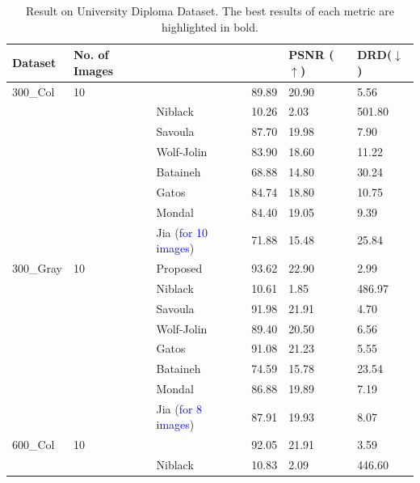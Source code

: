 \documentclass[runningheads]{llncs}
\begin{document}
\begin{table}[bht!]
	\centering
	\begin{threeparttable}
		\centering\small
		\caption{Result on University Diploma Dataset\label{tab:allResultStats}. The best results of each metric are highlighted in bold.}
		\centering
		\begin{tabular}{ P{1.4cm} P{1.2cm} P{1.8cm} P{1.8cm} P{1.2cm} P{1.4cm} }
			\toprule
			\centering
			{Dataset} &{No. of Images} &  &  & {PSNR} ($\uparrow$)& {DRD}($\downarrow$) \\ \midrule \midrule
			\centering
			{300\_Col}  &  10&  & 89.89 & 20.90 & \cellcolor{gray}5.56 
			\\ & & Niblack & 10.26 & 2.03 & 501.80 
			\\ & & Savoula & 87.70 & 19.98 & 7.90 
			\\ & & Wolf-Jolin & 83.90 & 18.60 & 11.22 \\ 
			& & Bataineh \cite{Bataineh2011} & 68.88 & 14.80 & 30.24 \\
			& & Gatos \cite{Gatos2006} & 84.74 & 18.80 & 10.75 \\
			& & Mondal \cite{Mondal2019} & 84.40 & 19.05 & 9.39 \\
			& & Jia \cite{Jia2018} (\textcolor{blue}{for 10 images}) & 71.88 & 15.48 & 25.84 \\
			\midrule
			\centering
			{300\_Gray}  & 10 & {Proposed} &  93.62 &  22.90 & \cellcolor{gray} 2.99 
			\\ & & Niblack & 10.61 & 1.85 & 486.97 
			\\ & & Savoula & 91.98 & 21.91 & 4.70 
			\\ & & Wolf-Jolin & 89.40 & 20.50 & 6.56 \\ 
			& & Gatos \cite{Gatos2006} & 91.08 & 21.23 & 5.55 \\
			& & Bataineh \cite{Bataineh2011} & 74.59 & 15.78 & 23.54 \\
			& & Mondal \cite{Mondal2019} & 86.88 & 19.89 & 7.19 \\
			& & Jia \cite{Jia2018} (\textcolor{blue}{for 8 images}) & 87.91 & 19.93 & 8.07 \\
			\midrule
			\centering
			{600\_Col}  & 10 &  &92.05 & 21.91 & 3.59  
			\\ & & Niblack & 10.83 & 2.09 & 446.60 

\end{tabular}
\end{threeparttable}
\end{table}
\end{document}
